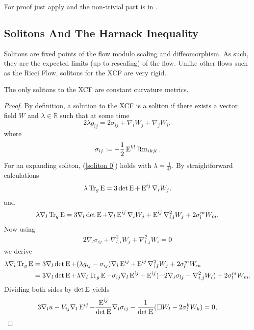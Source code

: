 \documentclass[a4paper, 12pt]{amsart}
\begin{document}
{\color{red}For proof just apply  and the non-trivial part is in \cite{MR3344442}.}

\subsection{Solitons And The Harnack Inequality}
\label{subsec:xcf_solitons}
Solitons are fixed points of the flow modulo scaling and diffeomorphism. As such, they are the expected limits (up to rescaling) of the flow. Unlike other flows such as the Ricci Flow, solitons for the XCF are very rigid.
\begin{lemma}
The only solitons to the XCF are constant curvature metrics.
\end{lemma}
\begin{proof}
By definition, a solution to the XCF is a soliton if there exists a vector field $W$ and $\lambda\in \mathbb{R}$ such that at some time
\begin{equation}\label{soliton 0}
2\lambda g_{ij}=2\sigma_{ij}+\nabla_iW_j+\nabla_jW_i,
\end{equation}
where \begin{equation}
\sigma_{ij}:=-\frac{1}{2}\operatorname{E}^{kl}\operatorname{Rm}_{ikjl}.
\end{equation}
For an expanding soliton, (\ref{soliton 0}) holds with $\lambda=\frac{1}{4t}.$ By straightforward calculations
\begin{align}\label{trace}
\lambda \operatorname{Tr}_g \operatorname{E}=3\det\operatorname{E}+\operatorname{E}^{ij}\nabla_iW_j.
\end{align}
and
\begin{align}\label{equ00}
\lambda \nabla_l \operatorname{Tr}_g \operatorname{E}=3\nabla_l\det\operatorname{E}+\nabla_l \operatorname{E}^{ij}\nabla_iW_j+\operatorname{E}^{ij}\nabla^2_{i,l}W_j+2\sigma_l^mW_m.
\end{align}
Now using
\begin{align}\label{eq: soliton derv}
2\nabla_l\sigma_{ij}+\nabla^2_{l,i}W_j+\nabla^2_{l,j}W_i=0
\end{align}
we derive
\begin{align}
\lambda \nabla_l \operatorname{Tr}_g \operatorname{E}&=3\nabla_l\det\operatorname{E}+(\lambda g_{ij}-\sigma_{ij})\nabla_l \operatorname{E}^{ij}+\operatorname{E}^{ij}\nabla^2_{i,l}W_j+2\sigma_l^mW_m\nonumber\\
&=3\nabla_l\det\operatorname{E}+\lambda \nabla_l \operatorname{Tr}_g \operatorname{E}-\sigma_{ij}\nabla_l \operatorname{E}^{ij}+\operatorname{E}^{ij}(-2\nabla_i\sigma_{lj}-\nabla^2_{i,j}W_l)+2\sigma_l^mW_m.
\end{align}
Dividing both sides by $\det\operatorname{E}$ yields
\begin{align}
3\nabla_lu-V_{ij}\nabla_l \Ein^{ij}-\frac{\Ein^{ij}}{\det\Ein}\nabla_l\sigma_{ij}-\frac{1}{\det\Ein}(\Box W_l-2\sigma_l^kW_k)=0,

\end{align}
\end{proof}
\end{document}
